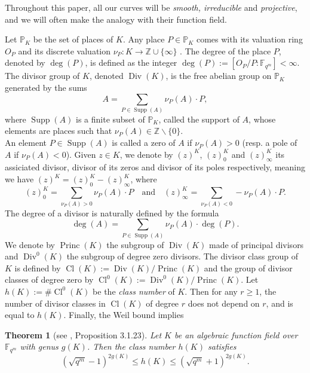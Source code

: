 \documentclass[10pt]{article}
\newtheorem{thm}{Theorem}
\theoremstyle{definition}
\theoremstyle{definition}
\theoremstyle{definition}
\newcommand{\cd}{\cdot}
\newcommand{\Z}{\mathbb{Z}}
\newcommand{\PP}{\mathbb{P}}
\newcommand{\fqm}{\mathbb{F}_{q^m}}
\newcommand{\Div}{\operatorname{Div}}
\newcommand{\Princ}{\operatorname{Princ}}
\newcommand{\Cl}{\operatorname{Cl}}
\newcommand{\Supp}{\operatorname{Supp}}
\begin{document}
Throughout this paper, all our curves will be \textit{smooth, irreducible} and \textit{projective}, and we will often make the analogy with their function field. 

\vspace*{0.2cm}

\noindent Let $\PP_K$ be the set of places of $K$. Any place $P \in \PP_K$ comes with its valuation ring $O_P$ and its discrete valuation $\nu_P : K \rightarrow \Z \cup \{\infty\}$ . The degree of the place $P$, denoted by $\deg(P)$, is defined as the  integer $\deg(P) :=  [O_P/P:\fqm] < \infty$.
The divisor group of $K$, denoted $\Div(K)$, is the free abelian group on $\mathbb{P}_K$ generated by the sums
\[A = \sum\limits_{P \in \Supp(A)} \nu_P(A) \cd P,\]
where $\Supp(A)$ is a finite subset of $\PP_K$, called the support of $A$, whose elements are places such that $\nu_{P}(A) \in \Z \backslash \{0\}$. \\ 
An element $P \in \Supp(A)$ is called a zero of $A$ if $\nu_P(A) >0$ (resp. a pole of $A$ if $\nu_P(A) < 0$). Given $z \in K$, we denote by $(z)^K$, $(z)^K_0$ and $(z)^K_{\infty}$ its assiciated divisor, divisor of its zeros and divisor of its poles respectively, meaning we have $(z)^K = (z)^K_0 - (z)^K_{\infty}$, where 
\[(z)^K_0 = \sum\limits_{\nu_P(A) > 0}\nu_P(A) \cd P \quad \textrm{and}  \quad (z)^K_{\infty} = \sum\limits_{\nu_P(A) < 0}-\nu_P(A) \cd P.\]
The degree of a divisor is naturally defined by the formula
\[\deg(A) = \sum\limits_{P \in \Supp(A)} \nu_P(A) \cd \deg( P).\]
We denote by $\Princ(K)$ the subgroup of $\Div(K)$ made of principal divisors and $\Div^0(K)$ the subgroup of degree zero divisors. The divisor class group of $K$ is defined by $\Cl(K):=\Div(K)/\Princ(K)$ and the group of divisor classes of degree zero by $\Cl^0(K):=\Div^0(K)/\Princ(K)$. 
Let $h(K):= \# \Cl^0(K)$ be the \emph{class number} of $K$. Then for any $r \geq 1$, the number of divisor classes in $\Cl(K)$ of degree $r$ does not depend on $r$, and is equal to $h(K)$. Finally, the Weil bound implies

\begin{thm}[see \cite{Tsf}, Proposition 3.1.23]\label{esti h(X)}
Let $K$ be an algebraic function field over $\fqm$ with genus $g(K)$. Then the class number $h(K)$ satisfies
\[ (\sqrt{q^m}-1)^{2g(K)} \leq h(K) \leq (\sqrt{q^m}+1)^{2g(K)}.\]
\end{thm}
\end{document}

